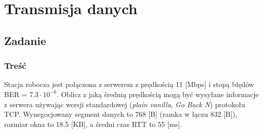 \documentclass[a4paper,twoside]{article}
\begin{document}
	
	\section*{Transmisja danych}
	\subsection*{Zadanie}
	\subsubsection*{Treść}
	Stacja robocza jest połączona z serwerem z prędkością 11 [Mbps] i stopą błędów BER = $ 7.3 \cdot 10 ^ {-6} $. Oblicz z jaką średnią prędkością mogą być wysyłane informacje z serwera używając wersji standardowej (\emph{plain vanilla}, \emph{Go Back N}) protokołu TCP. Wynegocjowany segment danych to 768 [B] (ramka w łączu 832 [B]), rozmiar okna to 18.5 [KB], a średni czas RTT to 55 [ms].
\end{document}
